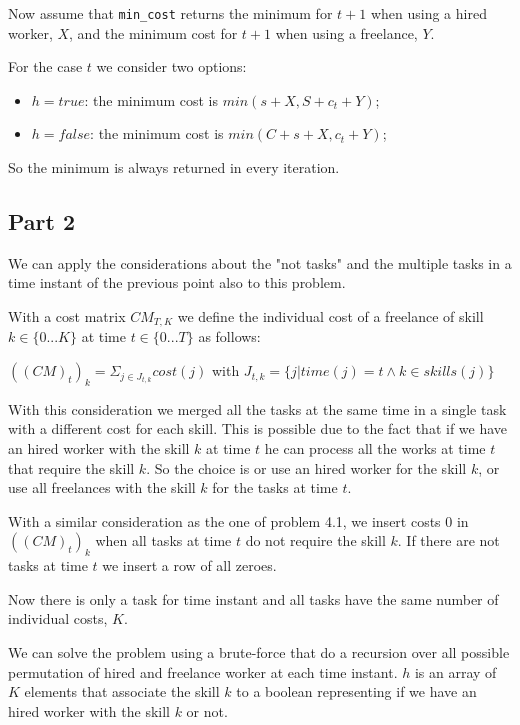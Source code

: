 \documentclass[paper=a4, fontsize=11pt]{scrartcl} %
\numberwithin{equation}{section} %
\numberwithin{figure}{section} %
\numberwithin{table}{section} %
\begin{document}
Now assume that \verb|min_cost| returns the minimum for $t+1$ when using a hired worker, $X$, and the minimum cost for $t+1$ when using a freelance, $Y$.

For the case $t$ we consider two options:
\begin{itemize}
    \item $h = true$: the minimum cost is $min(s + X, S + c_t + Y)$;
    \item $h = false$: the minimum cost is $min(C + s + X, c_t + Y)$;
\end{itemize}

So the minimum is always returned in every iteration.

\subsection*{Part 2}

We can apply the considerations about the "not tasks" and the multiple tasks in a time instant of the previous point also to this problem.

With a cost matrix $CM_{T,K}$ we define the individual cost of a freelance of skill $k \in \{0 ... K\}$ at time $t \in \{0 ... T\}$ as follows:

\bigskip
$((CM)_t)_k = \Sigma_{j \in J_{t,k}} cost(j)$ with $J_{t,k} = \{j | time(j) = t \land k \in skills(j)\}$
\bigskip

With this consideration we merged all the tasks at the same time in a single task with a different cost for each skill. 
This is possible due to the fact that if we have an hired worker with the skill $k$ at time $t$ he can process all the works at time $t$ that require the skill $k$.
So the choice is or use an hired worker for the skill $k$, or use all freelances with the skill $k$ for the tasks at time $t$.

With a similar consideration as the one of problem 4.1, we insert costs 0 in $((CM)_t)_k$ when all tasks at time $t$ do not require the skill $k$. If there are not tasks at time $t$ we insert a row of all zeroes.

Now there is only a task for time instant and all tasks have the same number of individual costs, $K$.

We can solve the problem using a brute-force that do a recursion over all possible permutation of hired and freelance worker at each time instant.
$h$ is an array of $K$ elements that associate the skill $k$ to a boolean representing if we have an hired worker with the skill $k$ or not.
\end{document}
